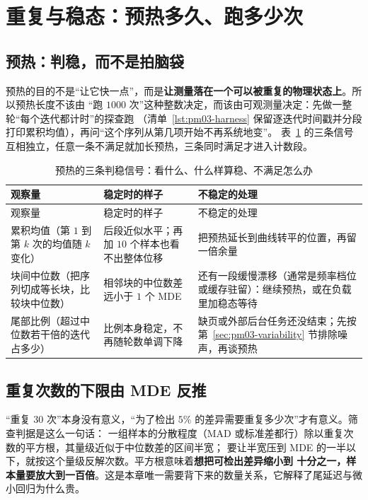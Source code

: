 \documentclass[12pt,a4paper,fontset=fandol]{ctexbook}
\newcommand{\Mx}[1]{\textsf{#1}}
\begin{document}
\section{重复与稳态：预热多久、跑多少次}
\label{sec:pm03-steady}

\subsection{预热：判稳，而不是拍脑袋}
\label{sub:pm03-warmup}

预热的目的不是``让它快一点''，而是\textbf{让测量落在一个可以被重复的物理状态上}。所以预热长度不该由
``跑 $1000$ 次''这种整数决定，而该由可观测量决定：先做一整轮``每个迭代都计时''的探查跑
（清单~\ref{lst:pm03-harness} 保留逐迭代时间戳并分段打印累积均值），再问``这个序列从第几项开始不再系统地变''。
表~\ref{tab:pm03-warmrule} 的三条信号互相独立，任意一条不满足就加长预热，三条同时满足才进入计数段。

\begin{longtable}{>{\raggedright\arraybackslash}p{} >{\raggedright\arraybackslash}p{} >{\raggedright\arraybackslash}p{}}
\caption{预热的三条判稳信号：看什么、什么样算稳、不满足怎么办}\label{tab:pm03-warmrule}\\
\toprule
观察量 & 稳定时的样子 & 不稳定的处理 \\
\midrule
\endfirsthead
\toprule
观察量 & 稳定时的样子 & 不稳定的处理 \\
\midrule
\endhead
\bottomrule
\endfoot
\endlastfoot
累积均值（第 $1$ 到第 $k$ 次的均值随 $k$ 变化） & 后段近似水平；再加 $10$ 个样本也看不出整体位移 &
把预热延长到曲线转平的位置，再留一倍余量 \\
块间中位数（把序列切成等长块，比较块中位数） & 相邻块的中位数差远小于 $1$ 个 \Mx{MDE} &
还有一段缓慢漂移（通常是频率档位或缓存驻留）：继续预热，或在负载里加稳态等待 \\
尾部比例（超过中位数若干倍的迭代占多少） & 比例本身稳定，不再随轮数单调下降 &
缺页或外部后台任务还没结束；先按第~\ref{sec:pm03-variability} 节排除噪声，再谈预热 \\
\end{longtable}

\subsection{重复次数的下限由 MDE 反推}
\label{sub:pm03-repeats}

``重复 $30$ 次''本身没有意义，``为了检出 $5\%$ 的差异需要重复多少次''才有意义。筛查判据是这么一句话：
一组样本的分散程度（\Mx{MAD} 或标准差都行）除以重复次数的平方根，其量级近似于中位数差的区间半宽；
要让半宽压到 \Mx{MDE} 的一半以下，就按这个量级反解次数。平方根意味着\textbf{想把可检出差异缩小到
十分之一，样本量要放大到一百倍}。这是本章唯一需要背下来的数量关系，它解释了尾延迟与微小回归为什么贵。
\end{document}
